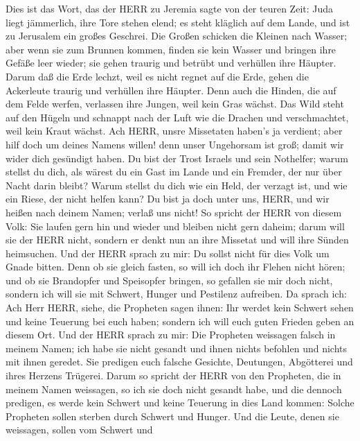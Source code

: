  Dies ist das Wort, das der HERR zu Jeremia sagte von der
teuren Zeit:  Juda liegt jämmerlich, ihre Tore stehen elend;
es steht kläglich auf dem Lande, und ist zu Jerusalem ein großes
Geschrei.  Die Großen schicken die Kleinen nach Wasser; aber
wenn sie zum Brunnen kommen, finden sie kein Wasser und bringen ihre
Gefäße leer wieder; sie gehen traurig und betrübt und verhüllen ihre
Häupter.  Darum daß die Erde lechzt, weil es nicht regnet
auf die Erde, gehen die Ackerleute traurig und verhüllen ihre Häupter.
 Denn auch die Hinden, die auf dem Felde werfen, verlassen
ihre Jungen, weil kein Gras wächst.  Das Wild steht auf den
Hügeln und schnappt nach der Luft wie die Drachen und verschmachtet,
weil kein Kraut wächst.  Ach HERR, unsre Missetaten haben's
ja verdient; aber hilf doch um deines Namens willen! denn unser
Ungehorsam ist groß; damit wir wider dich gesündigt haben. 
Du bist der Trost Israels und sein Nothelfer; warum stellst du dich, als
wärest du ein Gast im Lande und ein Fremder, der nur über Nacht darin
bleibt?  Warum stellst du dich wie ein Held, der verzagt
ist, und wie ein Riese, der nicht helfen kann? Du bist ja doch unter
uns, HERR, und wir heißen nach deinem Namen; verlaß uns nicht!
 So spricht der HERR von diesem Volk: Sie laufen gern hin
und wieder und bleiben nicht gern daheim; darum will sie der HERR nicht,
sondern er denkt nun an ihre Missetat und will ihre Sünden heimsuchen.
 Und der HERR sprach zu mir: Du sollst nicht für dies Volk
um Gnade bitten.  Denn ob sie gleich fasten, so will ich
doch ihr Flehen nicht hören; und ob sie Brandopfer und Speisopfer
bringen, so gefallen sie mir doch nicht, sondern ich will sie mit
Schwert, Hunger und Pestilenz aufreiben.  Da sprach ich:
Ach Herr HERR, siehe, die Propheten sagen ihnen: Ihr werdet kein Schwert
sehen und keine Teuerung bei euch haben; sondern ich will euch guten
Frieden geben an diesem Ort.  Und der HERR sprach zu mir:
Die Propheten weissagen falsch in meinem Namen; ich habe sie nicht
gesandt und ihnen nichts befohlen und nichts mit ihnen geredet. Sie
predigen euch falsche Gesichte, Deutungen, Abgötterei und ihres Herzens
Trügerei.  Darum so spricht der HERR von den Propheten, die
in meinem Namen weissagen, so ich sie doch nicht gesandt habe, und die
dennoch predigen, es werde kein Schwert und keine Teuerung in dies Land
kommen: Solche Propheten sollen sterben durch Schwert und Hunger.
 Und die Leute, denen sie weissagen, sollen vom Schwert und
